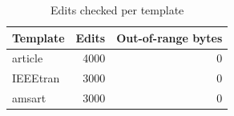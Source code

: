 \begin{table}[t]
  \caption{Edits checked per template}
  \label{tab:ablation}
  \centering
  \begin{tabular}{@{}lrr@{}}
    \toprule
    Template & Edits & Out-of-range bytes \\
    \midrule
    article & 4000 & 0 \\
    IEEEtran & 3000 & 0 \\
    amsart & 3000 & 0 \\
    \bottomrule
  \end{tabular}
\end{table}
